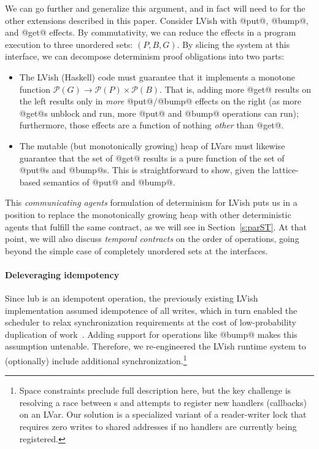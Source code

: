 We can go further and generalize this argument, and in fact will need
to for the other extensions described in this paper.  Consider LVish
with @put@, @bump@, and @get@ effects.  By commutativity, we can
reduce the effects in a program execution to three {unordered sets}:
$(P,B,G)$.  By slicing the system at this interface, we can decompose
determinism proof obligations into two parts:
\label{s:multiagent}
\begin{itemize}
\item The LVish (Haskell) code must guarantee that it implements a
  monotone function $\mathcal P(G) \rightarrow \mathcal P(P) \times
  \mathcal P(B)$.  That is, adding more @get@ results on the left
  results only in {\em more} @put@/@bump@ effects on the right (as
  more @get@s unblock and run, more @put@ and @bump@ operations can
  run); furthermore, those effects are a function of nothing {\em
    other} than @get@.
\item The mutable (but monotonically growing) heap of LVars must
  likewise guarantee that the set of @get@ results is a pure function
  of the set of @put@s and @bump@s.  This is straightforward to show,
  given the lattice-based semantics of @put@ and @bump@.
\end{itemize}
This {\em communicating agents} formulation of determinism for LVish
puts us in a position to replace the monotonically growing heap with
other deterministic agents that fulfill the same contract, as we will
see in Section~\ref{s:parST}.
%
At that point, we will also discuss \emph{temporal contracts} on the order of
operations, going beyond the simple case of completely unordered sets at the
interfaces.

\paragraph{Deleveraging idempotency}\label{s:dedup}

Since lub is an idempotent operation, the previously existing LVish
implementation assumed idempotence of all writes, which in turn
enabled the scheduler to relax synchronization requirements at the
cost of low-probability duplication of
work~\cite{Freeze-paper}. Adding support for operations like @bump@
makes this assumption untenable.  Therefore, we re-engineered the
LVish runtime system to (optionally) include additional
synchronization.\footnote{Space constraints preclude full description
  here, but the key challenge is resolving a race between s
  and attempts to register new handlers (callbacks) on an LVar.  Our
  solution is a specialized variant of a reader-writer lock that
  requires zero writes to shared addresses if no handlers are
  currently being registered.}

